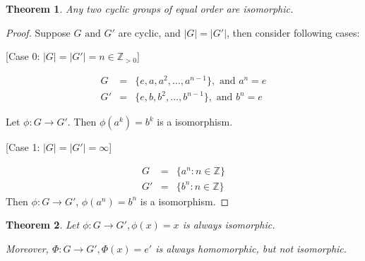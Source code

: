 \documentclass{article}
\theoremstyle{MyNonumberplain}
\theoremstyle{break}
\newtheorem*{proof}{Proof. }
\newcommand{\p}{\phi}
\newcommand{\infixand}{\text{ and }}
\theoremstyle{break}
\newtheorem{theorem}{Theorem}[section]
\theoremstyle{break}
\theoremstyle{definition}
\theoremstyle{break}
\begin{document}
\begin{thmbox}
    \begin{theorem}
        Any two cyclic groups of equal order are isomorphic. 
    \end{theorem}
    \begin{prfbox}
        \begin{proof}
            Suppose $G \infixand G'$ are cyclic, and $| G | = | G' |$, then consider
            following cases:\bigskip
            
                [Case 0: $| G | = | G' | = n \in \mathbb{Z}_{> 0}$]

            \begin{eqnarray*}
                G & = & \{ e, a, a^2, \ldots, a^{n - 1} \}, \infixand a^n = e\\
                G' & = & \{ e, b, b^2, \ldots, b^{n - 1} \}, \infixand b^n = e
            \end{eqnarray*}

            Let $\p : G \rightarrow G'$. Then $\p (a^k) = b^k$ is a isomorphism.\bigskip
            

                [Case 1: $| G | = | G' | = \infty$]

            \begin{eqnarray*}
            G & = & \{ a^n : n \in \mathbb{Z} \}\\
            G' & = & \{ b^n : n \in \mathbb{Z} \}
            \end{eqnarray*}
            Then $\p : G \rightarrow G'$, $\p (a^n) = b^n$ is a isomorphism.
        \end{proof}
    \end{prfbox}
\end{thmbox}

\begin{thmbox}
    \begin{theorem}
        Let $\p : G \rightarrow G', \p (x) = x$ is always isomorphic.\bigskip

        Moreover, $\Phi : G \rightarrow G', \Phi (x) = e'$ is always homomorphic, but
        not isomorphic.
    \end{theorem}

\end{thmbox}
\end{document}
